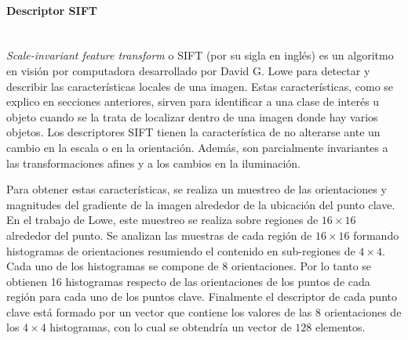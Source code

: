 \paragraph{Descriptor SIFT} ~\\

	\textit{Scale-invariant feature transform} o SIFT (por su sigla en inglés) es un algoritmo en visión por computadora desarrollado por David G. Lowe \cite{LoweDavid04} para detectar y describir las características locales de una imagen. Estas características, como se explico en secciones anteriores, sirven para identificar a una clase de interés u objeto cuando se la trata de localizar dentro de una imagen donde hay varios objetos. Los descriptores SIFT tienen la característica de no alterarse ante un cambio en la escala o en la orientación. Además, son parcialmente invariantes a las transformaciones afines y a los cambios en la iluminación.
		
	Para obtener estas características, se realiza un muestreo de las orientaciones y magnitudes del gradiente de la imagen alrededor de la ubicación del punto clave. En el trabajo de Lowe, este muestreo se realiza sobre regiones de $16 \times 16$ alrededor del punto. Se analizan las muestras de cada región de $16 \times 16$ formando histogramas de orientaciones resumiendo el contenido en sub-regiones de $4 \times 4$. Cada uno de los histogramas se compone de 8 orientaciones. Por lo tanto se obtienen 16 histogramas respecto de las orientaciones de los puntos de cada región para cada uno de los puntos clave. Finalmente el descriptor de cada punto clave está formado por un vector que contiene los valores de las $8$ orientaciones de los $4 \times 4$ histogramas, con lo cual se obtendría un vector de $128$ elementos.

	